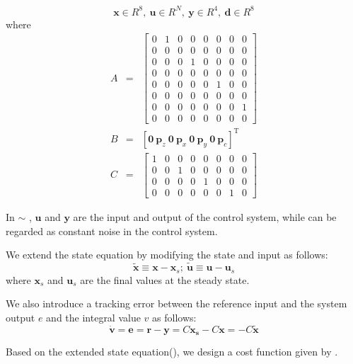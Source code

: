 \begin{equation*}
  \bm{x} \in  R^8, \ \bm{u} \in R^N, \ \bm{y} \in R^4, \ \bm{d} \in R^8
\end{equation*}
where 
\begin{eqnarray*}
  A&=&
  \begin{bmatrix}
    0 &1 &0 &0 &0 &0 &0 &0\\
    0 &0 &0 &0 &0 &0 &0 &0\\
    0 &0 &0 &1 &0 &0 &0 &0\\
    0 &0 &0 &0 &0 &0 &0 &0\\
    0 &0 &0 &0 &0 &1 &0 &0\\
    0 &0 &0 &0 &0 &0 &0 &0\\
    0 &0 &0 &0 &0 &0 &0 &1\\
    0 &0 &0 &0 &0 &0 &0 &0
  \end{bmatrix}\\
  B&=&[\bm{0} \ \bm{p}_z \ \bm{0} \ \bm{p}_x \ \bm{0} \ \bm{p}_y \ \bm{0} \ \bm{p}_c]^\mathrm{T}\\
  C&=&
  \begin{bmatrix}
    1 &0 &0 &0 &0 &0 &0 &0\\
    0 &0 &1 &0 &0 &0 &0 &0\\
    0 &0 &0 &0 &1 &0 &0 &0\\
    0 &0 &0 &0 &0 &0 &1 &0
  \end{bmatrix}
\end{eqnarray*}

In  $\sim$ , $\bm{u}$ and $\bm{y}$ are the input and output of the control system, while
can be regarded as constant noise in the control system. 
\par
We extend the state equation by modifying the state and input as follows:
\begin{equation}
  \tilde{\bm{x}} \equiv \bm{x}-\bm{x}_s; \ \tilde{\bm{u}} \equiv \bm{u}-\bm{u}_s 
\end{equation}
where $\bm{x}_s$ and $\bm{u}_s$ are the final values at the steady state.
\par
We also introduce a tracking error between the reference input and the system output $e$ and the integral value $v$ as follows: 
\begin{equation}
  \dot{\bm{v}}=\bm{e}=\bm{r}-\bm{y}=C\bm{x_s}-C\bm{x}=-C\tilde{\bm{x}}
\end{equation}
\par
Based on the extended state equation(), we design a cost function given by .

